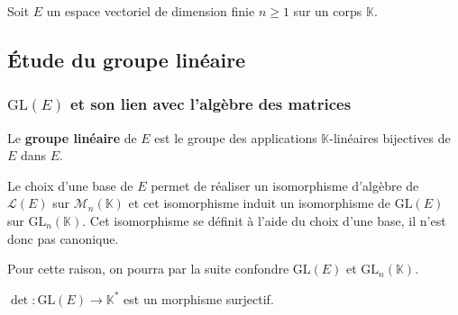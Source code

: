 




  Soit $E$ un espace vectoriel de dimension finie $n \geq 1$ sur un corps $\mathbb{K}$.

  \subsection{Étude du groupe linéaire}

  \subsubsection{\texorpdfstring{$\mathrm{GL}(E)$}{GL(E)} et son lien avec l'algèbre des matrices}


  \begin{definition}
    Le \textbf{groupe linéaire} de $E$ est le groupe des applications $\mathbb{K}$-linéaires bijectives de $E$ dans $E$.
  \end{definition}


  \begin{remark}
    Le choix d'une base de $E$ permet de réaliser un isomorphisme d'algèbre de $\mathcal{L}(E)$ sur $\mathcal{M}_n(\mathbb{K})$ et cet isomorphisme induit un isomorphisme de $\mathrm{GL}(E)$ sur $\mathrm{GL}_n(\mathbb{K})$.
    Cet isomorphisme se définit à l'aide du choix d'une base, il n'est donc pas canonique.
  \end{remark}

  Pour cette raison, on pourra par la suite confondre $\mathrm{GL}(E)$ et $\mathrm{GL}_n(\mathbb{K})$.

  \begin{proposition}
    $\det : \mathrm{GL}(E) \rightarrow \mathbb{K}^*$ est un morphisme surjectif.
  \end{proposition}



